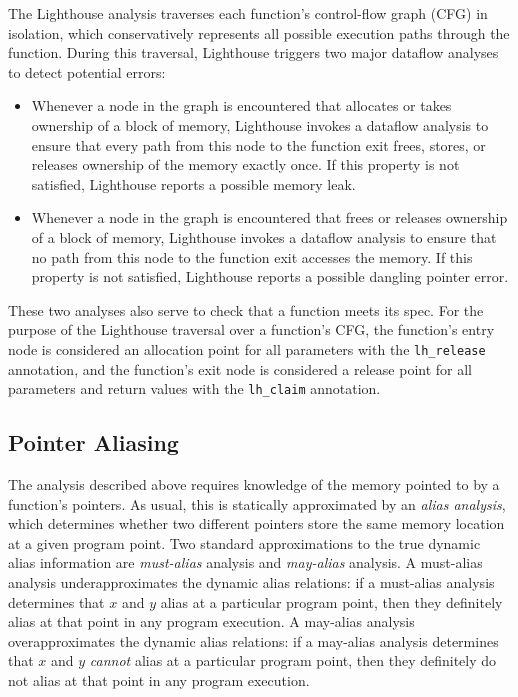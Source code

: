 The Lighthouse analysis traverses each function's control-flow graph (CFG)
in isolation, which conservatively represents all possible execution paths
through the function.  
%
During this traversal, Lighthouse triggers two major dataflow analyses to
detect potential errors:



\begin{itemize}



\item Whenever a node in the graph is encountered that allocates or takes
ownership of a block of memory, Lighthouse invokes a dataflow analysis to
ensure that every path from this node to the function exit frees, stores, or
releases ownership of the memory exactly once.  
%
If this property is not satisfied, Lighthouse reports a possible memory
leak.



\item Whenever a node in the graph is encountered that frees or releases
ownership of a block of memory, Lighthouse invokes a dataflow analysis to
ensure that no path from this node to the function exit accesses the memory.  
%
If this property is not satisfied, Lighthouse reports a possible dangling
pointer error.



\end{itemize}



These two analyses also serve to check that a function meets its spec.  
%
For the purpose of the Lighthouse traversal over a function's CFG, the
function's entry node is considered an allocation point for all parameters
with the {\tt lh\_release} annotation, and the function's exit node is
considered a release point for all parameters and return values with the
{\tt lh\_claim} annotation.  



\subsection{Pointer Aliasing}



The analysis described above requires knowledge of the memory pointed to by
a function's pointers.  
%
As usual, this is statically approximated by an {\em alias analysis}, which
determines whether two different pointers store the same memory location at
a given program point.  
%
Two standard approximations to the true dynamic alias information are {\em
must-alias} analysis and {\em may-alias} analysis.  
%
A must-alias analysis underapproximates the dynamic alias relations:  if a
must-alias analysis determines that $x$ and $y$ alias at a particular
program point, then they definitely alias at that point in any program
execution.  
%
A may-alias analysis overapproximates the dynamic alias relations:  if a
may-alias analysis determines that $x$ and $y$ {\em cannot} alias at a
particular program point, then they definitely do not alias at that point in
any program execution.



